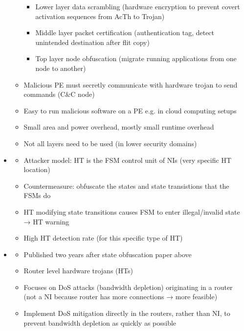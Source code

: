 \begin{itemize}
\begin{itemize}
                \begin{itemize}
                    \item Lower layer data scrambling (hardware encryption to prevent covert activation sequences from AcTh to Trojan)
                    \item Middle layer packet certification (authentication tag, detect unintended destination after flit copy)
                    \item Top layer node obfuscation (migrate running applications from one node to another)
                \end{itemize}
            \item Malicious PE must secretly communicate with hardware trojan to send commands (C\&C node)
            \item Easy to run malicious software on a PE e.g. in cloud computing setups
            \item Small area and power overhead, mostly small runtime overhead
            \item Not all layers need to be used (in lower security domains)
        \end{itemize}
    \item \textbf{}
        \begin{itemize}
            \item Attacker model: HT is the FSM control unit of NIs (very specific HT location)
            \item Countermeasure: obfuscate the states and state transistions that the FSMs do
            \item HT modifying state transitions causes FSM to enter illegal/invalid state → HT warning
            \item High HT detection rate (for this specific type of HT)
        \end{itemize}
    \item \textbf{} \checkmark
        \begin{itemize}
            \item Published two years after state obfuscation paper above
            \item Router level hardware trojans (HTs)
            \item Focuses on DoS attacks (bandwidth depletion) originating in a router (not a NI because router has more connections → more
                feasible)
            \item Implement DoS mitigation directly in the routers, rather than NI, to prevent bandwidth depletion as quickly as possible

\end{itemize}
\end{itemize}
